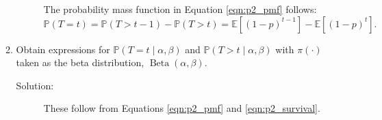 \documentclass[letterpaper,11pt]{article}
\begin{document}
\begin{enumerate}
\begin{enumerate}
\begin{description}
        The probability mass function in Equation \ref{eqn:p2_pmf} follows:
        \begin{equation*}
          \mathbb{P}\left(T = t\right)
          = \mathbb{P}\left(T > t - 1\right)
          - \mathbb{P}\left(T > t\right)
          = \mathbb{E}\left[\left(1-p\right)^{t-1}\right]
          - \mathbb{E}\left[\left(1-p\right)^{t}\right].
        \end{equation*}
      \end{description}
    \item Obtain expressions for
      $\mathbb{P}\left(T = t \mid \alpha, \beta\right)$ and
      $\mathbb{P}\left(T > t \mid \alpha, \beta\right)$ with
      $\pi\left(\cdot\right)$ taken as the beta distribution,
      $\operatorname{Beta}\left(\alpha, \beta\right)$.

      \begin{description}
      \item[Solution:] These follow from Equations
        \ref{eqn:p2_pmf} and \ref{eqn:p2_survival}.


\end{description}
\end{enumerate}
\end{enumerate}
\end{document}
